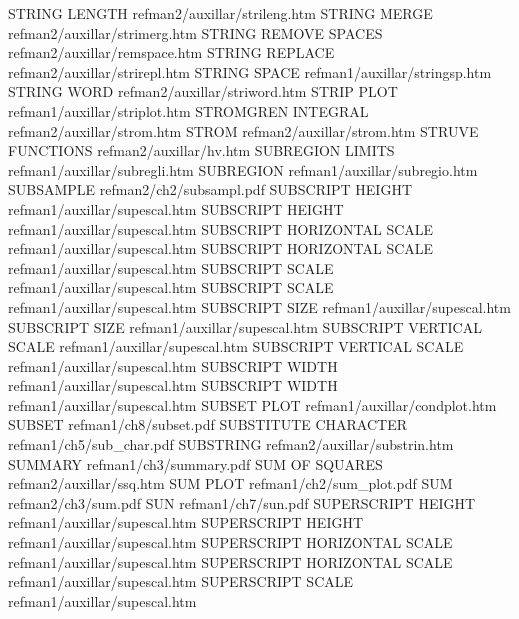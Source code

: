 STRING LENGTH                           refman2/auxillar/strileng.htm
STRING MERGE                            refman2/auxillar/strimerg.htm
STRING REMOVE SPACES                    refman2/auxillar/remspace.htm
STRING REPLACE                          refman2/auxillar/strirepl.htm
STRING SPACE                            refman1/auxillar/stringsp.htm
STRING WORD                             refman2/auxillar/striword.htm
STRIP PLOT                              refman1/auxillar/striplot.htm
STROMGREN INTEGRAL                      refman2/auxillar/strom.htm
STROM                                   refman2/auxillar/strom.htm
STRUVE FUNCTIONS                        refman2/auxillar/hv.htm
SUBREGION LIMITS                        refman1/auxillar/subregli.htm
SUBREGION                               refman1/auxillar/subregio.htm
SUBSAMPLE                               refman2/ch2/subsampl.pdf
SUBSCRIPT HEIGHT                        refman1/auxillar/supescal.htm
SUBSCRIPT HEIGHT                        refman1/auxillar/supescal.htm
SUBSCRIPT HORIZONTAL SCALE              refman1/auxillar/supescal.htm
SUBSCRIPT HORIZONTAL SCALE              refman1/auxillar/supescal.htm
SUBSCRIPT SCALE                         refman1/auxillar/supescal.htm
SUBSCRIPT SCALE                         refman1/auxillar/supescal.htm
SUBSCRIPT SIZE                          refman1/auxillar/supescal.htm
SUBSCRIPT SIZE                          refman1/auxillar/supescal.htm
SUBSCRIPT VERTICAL SCALE                refman1/auxillar/supescal.htm
SUBSCRIPT VERTICAL SCALE                refman1/auxillar/supescal.htm
SUBSCRIPT WIDTH                         refman1/auxillar/supescal.htm
SUBSCRIPT WIDTH                         refman1/auxillar/supescal.htm
SUBSET PLOT                             refman1/auxillar/condplot.htm
SUBSET                                  refman1/ch8/subset.pdf
SUBSTITUTE CHARACTER                    refman1/ch5/sub_char.pdf
SUBSTRING                               refman2/auxillar/substrin.htm
SUMMARY                                 refman1/ch3/summary.pdf
SUM OF SQUARES                          refman2/auxillar/ssq.htm
SUM PLOT                                refman1/ch2/sum_plot.pdf
SUM                                     refman2/ch3/sum.pdf
SUN                                     refman1/ch7/sun.pdf
SUPERSCRIPT HEIGHT                      refman1/auxillar/supescal.htm
SUPERSCRIPT HEIGHT                      refman1/auxillar/supescal.htm
SUPERSCRIPT HORIZONTAL SCALE            refman1/auxillar/supescal.htm
SUPERSCRIPT HORIZONTAL SCALE            refman1/auxillar/supescal.htm
SUPERSCRIPT SCALE                       refman1/auxillar/supescal.htm
